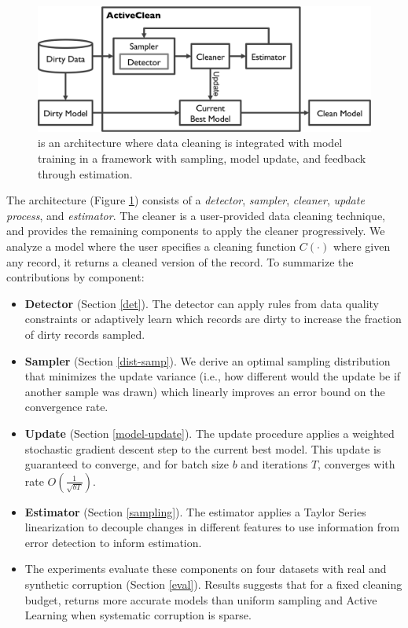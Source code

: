 \begin{figure}[t]
\centering
 \includegraphics[width=\columnwidth]{figs/arch.png}
 \caption{\sysfull is an architecture where data cleaning is integrated with model training in a framework with sampling, model update, and feedback through estimation. \label{sys-arch}}\vspace{-2em}
\end{figure}

The \sys architecture (Figure \ref{sys-arch}) consists of a \emph{detector}, \emph{sampler}, \emph{cleaner}, \emph{update process}, and \emph{estimator}.
The cleaner is a user-provided data cleaning technique, and \sys provides the remaining components to apply the cleaner progressively.
We analyze a model where the user specifies a cleaning function $C(\cdot)$ where given any record, it returns a cleaned version of the record.
To summarize the contributions by component:
\begin{itemize}[noitemsep]
\item \textbf{Detector} (Section \ref{det}). The detector can apply rules from data quality constraints or adaptively learn which records are dirty to increase the fraction of dirty records sampled.
\item \textbf{Sampler} (Section \ref{dist-samp}). We derive an optimal sampling distribution that minimizes the update variance (i.e., how different would the update be if another sample was drawn) which linearly improves an error bound on the convergence rate.
\item \textbf{Update} (Section \ref{model-update}). The update procedure applies a weighted stochastic gradient descent step to the current best model. This update is guaranteed to converge, and for batch size $b$ and iterations $T$, converges with rate $O(\frac{1}{\sqrt{bT}})$. 
\item \textbf{Estimator} (Section \ref{sampling}). The estimator applies a Taylor Series linearization to decouple changes in different features to use information from error detection to inform estimation.
\item The experiments evaluate these components on four datasets with real and synthetic corruption (Section \ref{eval}). Results suggests that for a fixed cleaning budget, \sys returns more accurate models than uniform sampling and Active Learning when systematic corruption is sparse.

\end{itemize}






